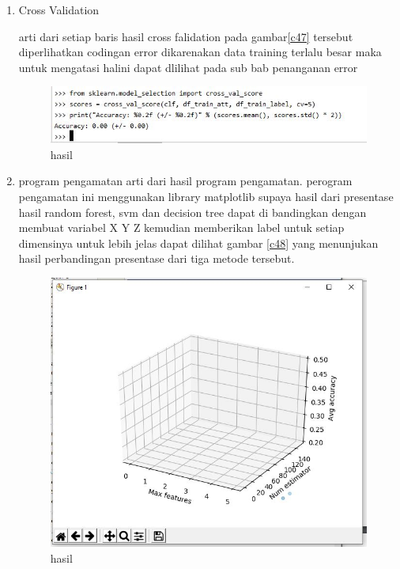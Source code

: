 \begin{enumerate}
\item Cross Validation\par
arti dari setiap baris hasil cross falidation pada gambar\ref{c47} tersebut diperlihatkan codingan error dikarenakan data training terlalu besar maka untuk mengatasi halini dapat dlilihat pada sub bab penanganan error 

\begin{figure}[ht]
\centering
\includegraphics[scale=0.5]{figures/1174051/3/10.JPG}
\caption{hasil}
\label{contoh}
\end{figure}

\item program pengamatan
arti dari hasil program pengamatan. perogram pengamatan ini menggunakan library matplotlib supaya hasil dari presentase hasil random forest, svm dan decision tree dapat di bandingkan dengan membuat variabel X Y Z kemudian memberikan label untuk setiap dimensinya untuk lebih jelas dapat dilihat gambar \ref{c48} yang menunjukan hasil perbandingan presentase dari tiga metode tersebut. 

\begin{figure}[ht]
\centering
\includegraphics[scale=0.5]{figures/1174051/3/11.JPG}
\caption{hasil}
\label{contoh}
\end{figure}
\end{enumerate}


